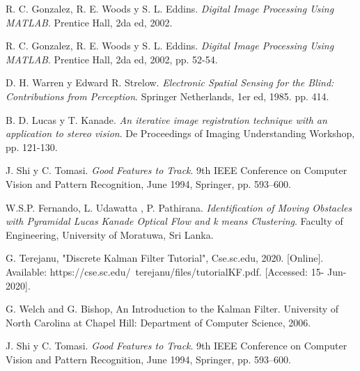 \begin{thebibliography}{9}

R. C. Gonzalez, R. E. Woods y S. L. Eddins. \textit{Digital Image Processing Using MATLAB}. Prentice Hall, 2da ed, 2002.%

R. C. Gonzalez, R. E. Woods y S. L. Eddins. \textit{Digital Image Processing Using MATLAB}. Prentice Hall, 2da ed, 2002, pp. 52-54.

D. H. Warren y Edward R. Strelow. \textit{Electronic Spatial Sensing for the Blind: Contributions from Perception}. Springer Netherlands, 1er ed, 1985. pp. 414.

B. D. Lucas y T. Kanade. \textit{An iterative image registration technique with an application to stereo vision}. De Proceedings of Imaging Understanding Workshop, pp. 121-130.

J. Shi y C. Tomasi. \textit{Good Features to Track}. 9th IEEE Conference on Computer Vision and Pattern Recognition, June 1994, Springer, pp. 593–600.

W.S.P. Fernando, L. Udawatta , P. Pathirana. \textit{Identification of Moving Obstacles with Pyramidal
Lucas Kanade Optical Flow and k means
Clustering}. Faculty of Engineering, University of Moratuwa, Sri Lanka.

G. Terejanu, "Discrete Kalman Filter Tutorial", Cse.sc.edu, 2020. [Online]. Available: https://cse.sc.edu/~terejanu/files/tutorialKF.pdf. [Accessed: 15- Jun- 2020].

G. Welch and G. Bishop, An Introduction to the Kalman Filter. University of North Carolina at Chapel Hill: Department of Computer Science, 2006.

J. Shi y C. Tomasi. \textit{Good Features to Track}. 9th IEEE Conference on Computer Vision and Pattern Recognition, June 1994, Springer, pp. 593–600.



\end{thebibliography}

